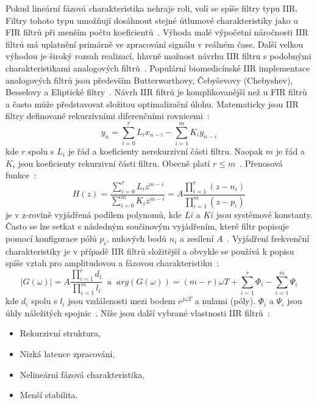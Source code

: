 Pokud lineární fázová charakteristika nehraje roli, volí se spíše filtry typu
IIR. Filtry tohoto typu umožňují dosáhnout stejné útlumové charakteristiky jako
u FIR filtrů při menším počtu koeficientů~\cite{Prchal2000}. Výhoda malé
výpočetní náročnosti IIR filtrů má uplatnění primárně ve zpracování signálu v
reálném čase. Další velkou výhodou je široký rozsah realizací, hlavně možnost
návrhu IIR filtru s podobnými charakteristikami analogových
filtrů~\cite{Jan2002,Lyons1997}. Populární biomedicínské IIR implementace
analogových filtrů jsou především Butterworthovy, Čebyševovy (Chebyshev),
Besselovy a Eliptické filtry~\cite{Paarmann2006}. Návrh IIR filtrů je
komplikovanější než u FIR filtrů a často může představovat složitou
optimalizační úlohu. Matematicky jsou IIR filtry definované rekurzivními
diferenčními rovnicemi~\cite{Jan2002}:
\begin{equation}
	\label{eq:conv_iir}
	y_n = \sum_{i=0}^{r} L_i x_{n-i} - \sum_{i=1}^{m} K_i y_{n-i}
\end{equation}
kde $r$ spolu s $L_i$ je řád a koeficienty nerekurzivní části filtru. Naopak $m$
je řád a $K_i$ jsou koeficienty rekurzivní části filtru. Obecně platí $r \leq
m$~\cite{Jan2002,Prchal2000}. Přenosová funkce~\cite{Jan2002}:
\begin{equation}
	\label{eq:transfer_iir}
	H(z) = \frac{\sum_{i=0}^{r} L_i z^{m-i}}{\sum_{i=0}^{m} K_i z^{m-i}} = A \frac{\prod_{i=1}^{r} (z-n_i)}{\prod_{i=1}^{m} (z-p_i)}
\end{equation}
je v z-rovině vyjádřená podílem polynomů, kde $Li$ a $Ki$ jsou systémové
konstanty. Často se lze setkat s následným součinovým vyjádřením, které filtr
popisuje pomocí konfigurace pólů $p_i$, nulových bodů $n_i$ a zesílení
$A$~\cite{Jan2002,Prchal2000}. Vyjádření frekvenční charakteristiky je v případě
IIR filtrů složitější a obvykle se používá k popisu spíše vztah pro amplitudovou
a fázovou charakteristiku~\cite{Jan2002}:
\begin{equation}
	\label{eq:ampphase_iir}
	|G(\omega)| = A \frac{\prod_{i=1}^{r} d_i}{\prod_{i=1}^{m} l_i} ~\text{~a~}~ arg(G(\omega)) = (m-r)\omega T + \sum_{i=1}^{r} \Phi_i - \sum_{i=1}^{m} \Psi_i
\end{equation}
kde $d_i$ spolu s $l_i$ jsou vzdálenosti mezi bodem $e^{j\omega T}$ a nulami
(póly). $\Phi_i$ a $\Psi_i$ jsou úhly náležitých
spojnic~\cite{Prchal2000,Jan2002}. Níže jsou další vybrané vlastnosti IIR
filtrů~\cite{Jan2002}:
\begin{itemize}[noitemsep]
	\item Rekurzivní struktura,
	\item Nízká latence zpracování,
	\item Nelineární fázová charakteristika,
	\item Menší stabilita.
\end{itemize}

